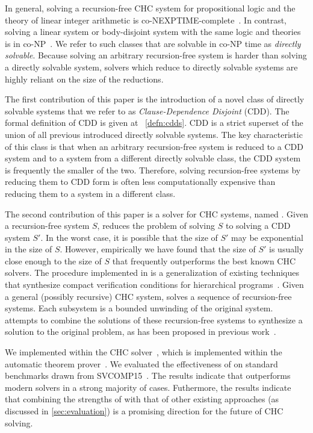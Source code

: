 In general, solving a recursion-free CHC system for
propositional logic and the theory of linear integer arithmetic is
co-NEXPTIME-complete~\cite{rummer13b}.
%
In contrast, solving a linear system or body-disjoint system with the
same logic and theories is in co-NP~\cite{rummer13b}.
%
We refer to such classes that are solvable in co-NP time as
\emph{directly solvable}.
%
Because solving an arbitrary recursion-free system is harder than
solving a directly solvable system, solvers which reduce to directly
solvable systems are highly reliant on the size of the reductions.

The first contribution of this paper is the introduction of a novel
class of directly solvable systems that we refer to as
\emph{Clause-Dependence Disjoint} (CDD).
%
The formal definition of CDD is given at ~\autoref{defn:cdds}.
%
CDD is a strict superset of the union of all previous introduced directly
solvable systems.
%
The key characteristic of this class is that when an arbitrary
recursion-free system is reduced to a CDD system and to a system from
a different directly solvable class, the CDD system is frequently the
smaller of the two.
%
Therefore, solving recursion-free systems by reducing them to CDD form
is often less computationally expensive than reducing them to a
system in a different class.

The second contribution of this paper is a solver for CHC systems,
named \sys.
%
Given a recursion-free system $S$, \sys reduces the problem of solving
$S$ to solving a CDD system $S'$.
%
In the worst case, it is possible that the size of $S'$ may be
exponential in the size of $S$.
%
However, empirically we have found that the size of $S'$ is usually
close enough to the size of $S$ that \sys frequently outperforms the best
known CHC solvers.
%
The procedure implemented in \sys is a generalization of existing
techniques that synthesize compact verification conditions for
hierarchical programs~\cite{flanagan01,lal-qadeer15}.
%
Given a general (possibly recursive) CHC system, \sys solves a
sequence of recursion-free systems.
%
Each subsystem is a bounded unwinding of the original system. \sys
attempts to combine the solutions of these recursion-free systems to
synthesize a solution to the original problem, as has been proposed
in previous work~\cite{rummer13b}.

We implemented \sys within the \duality CHC solver~\cite{bjorner13},
which is implemented within the \zthree automatic theorem
prover~\cite{moura08}.
%
We evaluated the effectiveness of \sys on standard benchmarks drawn
from SVCOMP15~\cite{svcomp15}.
%
The results indicate that \sys outperforms modern solvers in a strong
majority of cases.
%
Futhermore, the results indicate that combining the strengths of \sys
with that of other existing approaches (as discussed in
\autoref{sec:evaluation}) is a promising direction for the future of
CHC solving.

